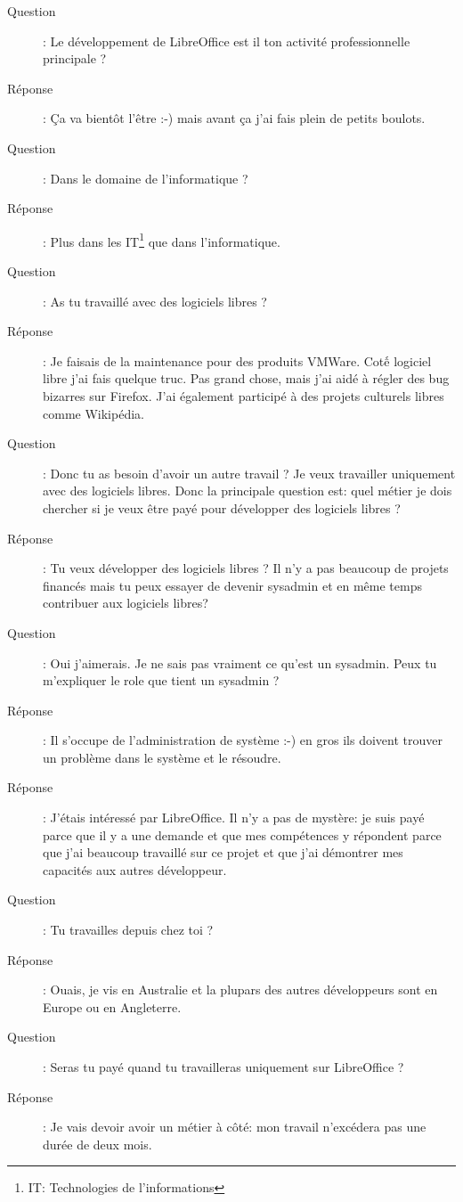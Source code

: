 \documentclass[a4paper,12pt, draft]{report}
\begin{document}
\begin{description}
\item [Question]:  Le développement de LibreOffice est il ton activité professionnelle principale ?
\item [Réponse]:  Ça va bientôt l'être :-) mais avant ça j'ai fais plein de petits boulots.
\item [Question]:  Dans le domaine de l'informatique ?
\item [Réponse]:  Plus dans les IT\footnote{\textsc{IT}: Technologies de l'informations} que dans l'informatique.
\item [Question]:  As tu travaillé avec des logiciels libres ?
\item [Réponse]:  Je faisais de la maintenance pour des produits VMWare. Cotế logiciel libre j'ai fais quelque truc. Pas grand chose, mais j'ai aidé à régler des bug bizarres sur Firefox. J'ai également participé à des projets culturels libres comme Wikipédia.
\item [Question]:  Donc tu as besoin d'avoir un autre travail ? Je veux travailler uniquement avec des logiciels libres. Donc la principale question est: quel métier je dois chercher si je veux être payé pour développer des logiciels libres ?
\item [Réponse]:  Tu veux développer des logiciels libres ? Il n'y a pas beaucoup de projets financés mais tu peux essayer de devenir sysadmin et en même temps contribuer aux logiciels libres?
\item [Question]:  Oui j'aimerais. Je ne sais pas vraiment ce qu'est un sysadmin. Peux tu m'expliquer le role que tient un sysadmin ?
\item [Réponse]:  Il s'occupe de l'administration de système :-) en gros ils doivent trouver un problème dans le système et le résoudre.
\item [Réponse]:  J'étais intéressé par LibreOffice. Il n'y a pas de mystère: je suis payé parce que il y a une demande et que mes compétences y répondent parce que j'ai beaucoup travaillé sur ce projet et que j'ai démontrer mes capacités aux autres développeur.
\item [Question]:  Tu travailles depuis chez toi ?
\item [Réponse]:  Ouais, je vis en Australie et la plupars des autres développeurs sont en Europe ou en Angleterre.
\item [Question]:  Seras tu payé quand tu travailleras uniquement sur LibreOffice ?
\item [Réponse]:  Je vais devoir avoir un métier à côté: mon travail n'excédera pas une durée de deux mois. 

\end{description}
\end{document}
